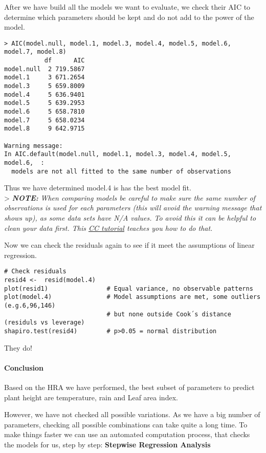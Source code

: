 \documentclass[
]{article}
\begin{document}
After we have build all the models we want to evaluate, we check their
AIC to determine which parameters should be kept and do not add to the
power of the model.

\begin{verbatim}
> AIC(model.null, model.1, model.3, model.4, model.5, model.6, model.7, model.8)                
           df      AIC
model.null  2 719.5867
model.1     3 671.2654
model.3     5 659.8009
model.4     5 636.9401
model.5     5 639.2953
model.6     5 658.7810
model.7     5 658.0234
model.8     9 642.9715

Warning message:
In AIC.default(model.null, model.1, model.3, model.4, model.5, model.6,  :
  models are not all fitted to the same number of observations
\end{verbatim}

Thus we have determined model.4 is has the best model fit.\\
\textgreater{} \textbf{\emph{NOTE:}} \emph{When comparing models be
careful to make sure the same number of observations is used for each
parameters (this will avoid the warning message that shows up), as some
data sets have N/A values. To avoid this it can be helpful to clean your
data first. This
\href{https://ourcodingclub.github.io/tutorials/data-manip-efficient/}{CC
tutorial} teaches you how to do that.}

Now we can check the residuals again to see if it meet the assumptions
of linear regression.

\begin{verbatim}
# Check residuals 
resid4 <-  resid(model.4)
plot(resid1)                # Equal variance, no observable patterns
plot(model.4)               # Model assumptions are met, some outliers (e.g.6,96,146)
                            # but none outside Cook´s distance (residuls vs leverage)
shapiro.test(resid4)        # p>0.05 = normal distribution
\end{verbatim}

They do!

\hypertarget{conclusion}{%
\paragraph{Conclusion}\label{conclusion}}

Based on the HRA we have performed, the best subset of parameters to
predict plant height are temperature, rain and Leaf area index.

However, we have not checked all possible variations. As we have a big
number of parameters, checking all possible combinations can take quite
a long time. To make things faster we can use an automated computation
process, that checks the models for us, step by step: \textbf{Stepwise
Regression Analysis}
\end{document}
